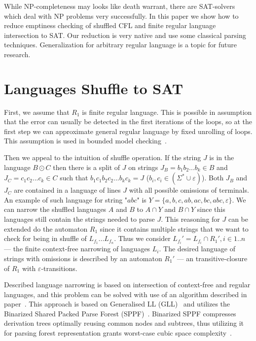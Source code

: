While NP-completeness may looks like death warrant, there are SAT-solvers which deal with NP problems very successfully.
In this paper we show how to reduce emptiness checking of shuffled CFL and finite regular language intersection to SAT.
Our reduction is very native and use some classical parsing techniques.
Generalization for arbitrary regular language is a topic for future research.


\section{Languages Shuffle to SAT}

First, we assume that $ R_1 $ is finite regular language.
This is possible in assumption that the error can usually be detected in the first iterations of the loops,
so at the first step we can approximate general regular language by fixed unrolling of loops.
This assumption is used in bounded model checking~\cite{BMC}.%

Then we appeal to the intuition of shuffle operation.
If the string $J$ is in the language $B \odot C$ then there is a split of $J$ on strings $J_B = b_1 b_2 ... b_k \in B$
and $J_C = c_1 c_2 ... c_k \in C$
such that $b_1 c_1 b_2 c_2 ... b_k c_k = J$ ($b_i, c_i \in (\Sigma^* \cup \varepsilon)$).
Both $J_B$ and $J_C$ are contained in a language of lines $J$ with all possible omissions of terminals.
An example of such language for string "$abc$" is $Y = \{a, b, c, ab, ac, bc, abc, \varepsilon\}$.
We can narrow the shuffled languages $A$ and $B$ to $A\cap Y$ and $B \cap Y$ since this languages still
contain the strings needed to parse $J$.
This reasoning for $J$ can be extended do the automaton $R_1$ since it contains multiple strings
that we want to check for being in shuffle of $L_{f_1} ... L_{f_n}$. 
Thus we consider $ L_{f_i}' = L_{f_i} \cap R_1', i \in 1..n$ --- the finite context-free narrowing of languages $ L_{i}$.
The desired language of strings with omissions is described by an automaton
$R_1'$ --- an transitive-closure of $ R_1 $ with $\varepsilon$-transitions.

Described language narrowing is based on intersection of context-free and regular languages,
and this problem can be solved with use of an algorithm described in paper~\cite{Grigorev}.
This approach is based on Generalised LL (GLL)~\cite{scott2010gll} and utilizes the
Binarized Shared Packed Parse Forest (SPPF)~\cite{brnglr, SPPF}.
Binarized SPPF compresses derivation trees optimally reusing common nodes and subtrees, thus 
utilizing it for parsing forest representation grants worst-case cubic space complexity~\cite{scott2010gll}.

